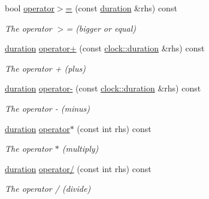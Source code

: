 \begin{DoxyCompactItemize}
bool \hyperlink{classclock_1_1duration_a28914682551eadbe17b89e53259507ce}{operator$>$=} (const \hyperlink{classclock_1_1duration}{duration} \&rhs) const 
\begin{DoxyCompactList}\small\item\em The operator $>$= (bigger or equal) \end{DoxyCompactList}\item 
\hyperlink{classclock_1_1duration}{duration} \hyperlink{classclock_1_1duration_a1d841ad681e11bc3f8a03ee768cee75d}{operator+} (const \hyperlink{classclock_1_1duration}{clock\+::duration} \&rhs) const 
\begin{DoxyCompactList}\small\item\em The operator + (plus) \end{DoxyCompactList}\item 
\hyperlink{classclock_1_1duration}{duration} \hyperlink{classclock_1_1duration_acea1d057193428dc67c111b7a21e9a61}{operator-\/} (const \hyperlink{classclock_1_1duration}{clock\+::duration} \&rhs) const 
\begin{DoxyCompactList}\small\item\em The operator -\/ (minus) \end{DoxyCompactList}\item 
\hyperlink{classclock_1_1duration}{duration} \hyperlink{classclock_1_1duration_a587f815a0f3bc4eb58e8d301e01b01cc}{operator$\ast$} (const int rhs) const 
\begin{DoxyCompactList}\small\item\em The operator $\ast$ (multiply) \end{DoxyCompactList}\item 
\hyperlink{classclock_1_1duration}{duration} \hyperlink{classclock_1_1duration_afb4aadafb5b95066f6e798c1e0eaf73c}{operator/} (const int rhs) const 
\begin{DoxyCompactList}\small\item\em The operator / (divide) \end{DoxyCompactList}\end{DoxyCompactItemize}
